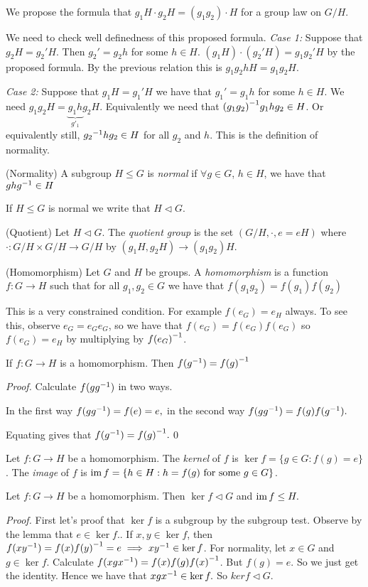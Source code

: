 \documentclass{article}
\newcommand{\nrm}{\triangleleft}
\begin{document}
We propose the formula that $ g_1H\cdot g_2H=(g_1g_2)\cdot H $ for a group law on $ G/H $.

We need to check well definedness of this proposed formula.
\textit{Case 1:} Suppose that $ g_2H=g_2'H. $ Then $ g_2'=g_2h $ for some $ h\in H $. $ (g_1H)\cdot (g_2'H)=g_1g_2'H $ by the proposed formula. By the previous relation this is $ g_1g_2hH=g_1g_2H $.
\par
\textit{Case 2:} Suppose that $ g_1H=g_1'H $ we have that $ g_1'=g_1h $ for some $ h\in H $. We need $ g_1g_2 H = \underbrace{g_1h}_{g'_1}g_2H $. Equivalently we need that $ {(g_1g_2)}^{-1}g_1hg_2\in H $. Or equivalently still, $ {g_2}^{-1}hg_2\in H $ for all $ g_2 $ and $ h $. This is the definition of normality.
\begin{definition}
		(Normality) A subgroup $ H\le G $ is \textit{normal} if $ \forall g \in G $, $ h\in H $, we have that $ gh{g}^{-1}\in H $
\end{definition}
If $ H\le G $ is normal we write that $ H \triangleleft G $.
\begin{definition}
	(Quotient) Let $ H\triangleleft G $. The \textit{quotient group} is the set $ (G/H, \cdot, e=eH) $ where $ \cdot:G/H\times G/H \rightarrow G/H $ by $ (g_1H,g_2H)\rightarrow (g_1g_2)H $.
\end{definition}

\begin{definition}
	(Homomorphism) Let $ G $ and $ H $ be groups. A \textit{homomorphism} is a function $ f: G\rightarrow H $ such that for all $ g_1,g_2\in G $ we have that $ f(g_1g_2)=f(g_1)f(g_2) $
\end{definition}
This is a very constrained condition. For example $ f(e_G)=e_H $ always. To see this, observe $ e_G=e_Ge_G $, so we have that $ f(e_G)=f(e_G)f(e_G) $ so $ f(e_G)=e_H $ by multiplying by $ {f(e_G)}^{-1} $.
\begin{lemma}
	If $ f:G\rightarrow H $ is a homomorphism. Then $ f({g}^{-1})={f(g)}^{-1} $
\end{lemma}
\textit{Proof.} Calculate $ f(g{g}^{-1}) $ in two ways.

In the first way $ f(g{g}^{-1})=f(e)=e, $ in the second way $ f(g{g}^{-1})=f(g)f({g}^{-1}). $

Equating gives that $ f({g}^{-1})={f(g)}^{-1}. $\qed
\begin{definition}
	Let $ f:G\rightarrow H $ be a homomorphism. The \textit{kernel} of $ f $ is $ \ker f =\{g\in G: f(g)=e\} $. The \textit{image} of $ f $ is $ \operatorname{im} f=\{ h\in H: h=f(g)\text{ for some } g\in G\} $.
	\end{definition}
\begin{proposition}
	Let $ f:G\rightarrow H $ be a homomorphism. Then $ \ker f \triangleleft G $ and $ \operatorname{im} f \le H.$
\end{proposition}
\textit{Proof.} First let's proof that $ \ker f $ is a subgroup by the subgroup test. Observe by the lemma that $ e\in\ker f. $. If $ x,y \in\ker f $, then $ f(x{y}^{-1})=f(x){f(y)}^{-1}=e\implies x{y}^{-1}\in \ker f $. For normality, let $ x\in G $ and $ g\in\ker f $. Calculate $ f(xg{x}^{-1})=f(x)f(g){f(x)}^{-1} $. But $ f(g)=e $. So we just get the identity. Hence we have that $ xg{x}^{-1}\in\ker f. $ So $ ker f\nrm G $.
\end{document}
